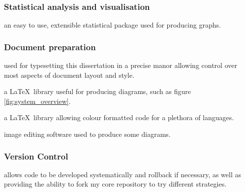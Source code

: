 \documentclass[12pt,twoside,notitlepage]{report}
\begin{document}
        \subsubsection{Statistical analysis and visualisation}
            \begin{description}[font=\normalfont\itshape, labelindent=10pt]
                \item[Matlab:] an easy to use, extensible statistical package used for producing graphs.
            \end{description}

        \subsubsection{Document preparation}
            \begin{description}[font=\normalfont\itshape, labelindent=10pt]
                \item[\LaTeX:] used for typesetting this dissertation in a precise manor allowing control over most 
                    aspects of document layout and style.
                \item[Tikz:] a \LaTeX\ library useful for producing diagrams, such as figure \ref{fig:system_overview}.
                \item[Listings:] a \LaTeX\ library allowing colour formatted code for a plethora of languages.
                \item[Adobe Photoshop:] image editing software used to produce some diagrams.
            \end{description}

        \subsubsection{Version Control}
            \begin{description}[font=\normalfont\itshape, labelindent=10pt]
                \item[Git:] allows code to be developed systematically and rollback if necessary, as well as providing  
                    the ability to fork my core repository to try different strategies.
            \end{description}
\end{document}
